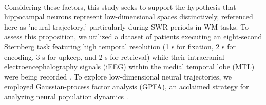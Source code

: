 \\
\indent
Considering these factors, this study seeks to support the hypothesis that hippocampal neurons represent low-dimensional spaces distinctively, referenced here as 'neural trajectory,' particularly during SWR periods in WM tasks. To assess this proposition, we utilized a dataset of patients executing an eight-second Sternberg task featuring high temporal resolution (1 s for fixation, 2 s for encoding, 3 s for upkeep, and 2 s for retrieval) while their intracranial electroencephalography signals (iEEG) within the medial temporal lobe (MTL) were being recorded \cite{boran_dataset_2020}. To explore low-dimensional neural trajectories, we employed Gaussian-process factor analysis (GPFA), an acclaimed strategy for analyzing neural population dynamics \cite{yu_gaussian-process_2009}.
\label{sec:introduction}